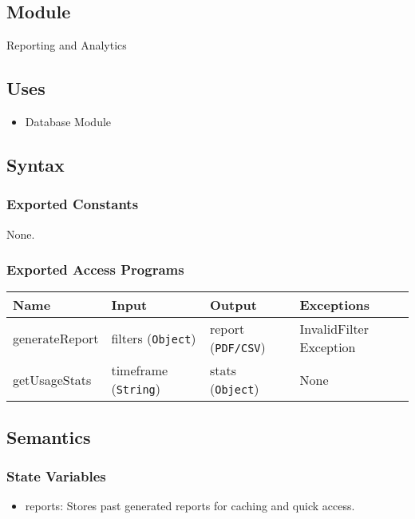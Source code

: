 \documentclass[12pt, titlepage]{article}
\begin{document}
\subsection{Module}
Reporting and Analytics

\subsection{Uses}
\begin{itemize}
    \item Database Module
\end{itemize}

\subsection{Syntax}
\subsubsection{Exported Constants}
None.

\subsubsection{Exported Access Programs}
\begin{center}
    \scriptsize
    \begin{tabular}{|p{2cm}|p{4cm}|p{4cm}|p{2cm}|} %
        \hline
        \textbf{Name} & \textbf{Input} & \textbf{Output} & \textbf{Exceptions} \\
        \hline
        generateReport & filters (\texttt{Object}) & report (\texttt{PDF/CSV}) & InvalidFilter \newline Exception \\
        \hline
        getUsageStats & timeframe (\texttt{String}) & stats (\texttt{Object}) & None \\
        \hline
    \end{tabular}
\end{center}

\subsection{Semantics}
\subsubsection{State Variables}
\begin{itemize}
    \item reports: Stores past generated reports for caching and quick access.
\end{itemize}
\end{document}
